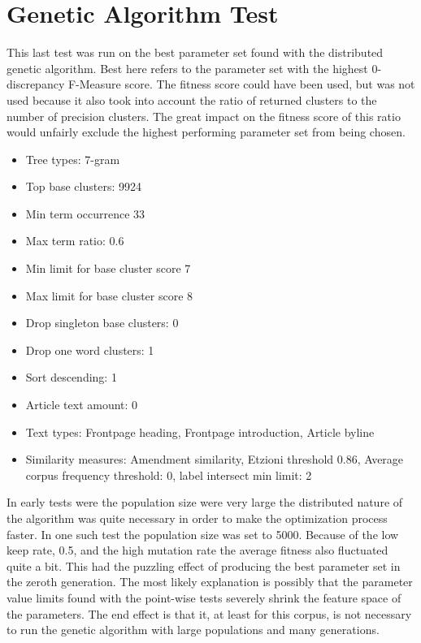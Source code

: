 \section{Genetic Algorithm Test}
This last test was run on the best parameter set found with the distributed genetic algorithm. Best here refers to the parameter set with the highest 0-discrepancy F-Measure score. The fitness score could have been used, but was not used because it also took into account the ratio of returned clusters to the number of precision clusters. The great impact on the fitness score of this ratio would unfairly exclude the highest performing parameter set from being chosen.

\begin{itemize}
  \item Tree types: 7-gram
  \item Top base clusters: 9924
  \item Min term occurrence 33
  \item Max term ratio: 0.6
  \item Min limit for base cluster score 7
  \item Max limit for base cluster score 8
  \item Drop singleton base clusters: 0
  \item Drop one word clusters: 1
  \item Sort descending: 1
  \item Article text amount: 0
  \item Text types: Frontpage heading, Frontpage introduction, Article byline
  \item Similarity measures: Amendment similarity, Etzioni threshold 0.86, Average corpus frequency threshold: 0, label intersect min limit: 2
\end{itemize}

In early tests were the population size were very large the distributed nature of the algorithm was quite necessary in order to make the optimization process faster. In one such test the population size was set to 5000. Because of the low keep rate, 0.5, and the high mutation rate the average fitness also fluctuated quite a bit. This had the puzzling effect of producing the best parameter set in the zeroth generation. The most likely explanation is possibly that the parameter value limits found with the point-wise tests severely shrink the feature space of the parameters. The end effect is that it, at least for this corpus, is not necessary to run the genetic algorithm with large populations and many generations.

